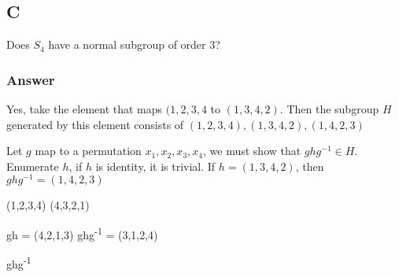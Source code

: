 \documentclass[11pt]{article}
\begin{document}
\subsection{C}
\label{sec:org0b040b7}


Does \(S_4\) have a normal subgroup of order 3?
\subsubsection{Answer}
\label{sec:org8452dfc}

Yes, take the element that maps \((1,2,3,4\) to \((1, 3,4,2)\). Then the
subgroup \(H\) generated by this element consists of \((1,2,3,4), (1,3,4,2), (1,4,2,3)\)


Let \(g\) map to a permutation \(x_1, x_2, x_3, x_4\), we must show that
\(ghg^{-1} \in H\). Enumerate \(h\), if \(h\) is identity, it is trivial. If \(h
= (1,3,4,2)\), then \(ghg^{-1} = (1,4,2,3)\)

(1,2,3,4)
(4,3,2,1)


gh = (4,2,1,3)
ghg\textsuperscript{-1} = (3,1,2,4)



ghg\textsuperscript{-1}
\end{document}
